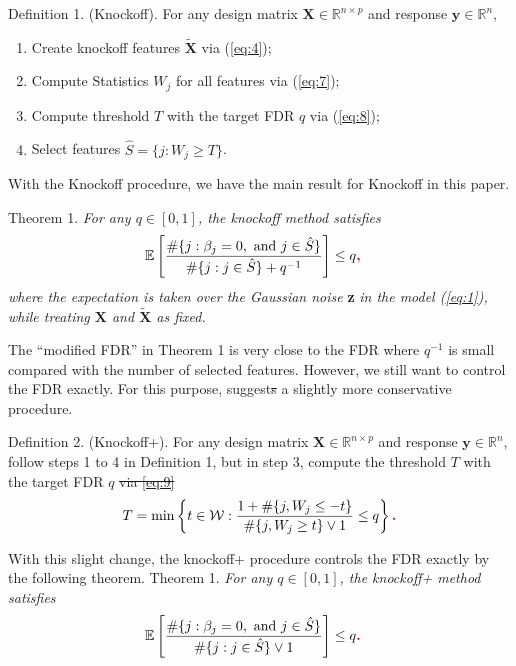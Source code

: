 \documentclass{uwstat572}
\newcommand{\vmdel}[1]{\sout{#1}}
\newcommand{\vmadd}[1]{\textbf{\color{red}{#1}}}
\begin{document}
{\sc Definition 1. }(Knockoff). For any design matrix $\bm{X}\in\mathbb{R}^{n\times p}$ and response $\bm{y}\in \mathbb{R}^n$, 
\begin{enumerate}
	\item Create knockoff features $\bm{\tilde X}$ via (\ref{eq:4});
	\item Compute Statistics $W_j$ for all features via (\ref{eq:7});
	\item Compute threshold $T$ with the target FDR $q$ via (\ref{eq:8});
	\item Select features $\hat{S} =\{j: W_j\geq T\}$.
\end{enumerate}

With the Knockoff procedure, we have the main result for Knockoff in this paper.

{\sc Theorem 1. } {\it For any $q\in[0,1]$, the knockoff method satisfies }
\begin{align*}
& \mathbb{E}\left[\frac{\#\{j:\beta_j=0,\text{ and }j\in \hat{S} \}}{\#\{j:j\in \hat{S} \} + q^{-1}} \right]\leq q\vmadd{,}
\end{align*}
{\it where the expectation is taken over the Gaussian noise }\textbf{z} {\it in the model (\ref{eq:1}), while treating $\bm{X}$ and $\bm{\tilde{X}}$ as fixed. }

The ``modified FDR'' in Theorem 1 is very close to the FDR where $q^{-1}$ is small compared with the number of selected features. However, we still want to control the FDR exactly. For this purpose, \cite{barber2015controlling} suggest\vmdel{s} a slightly more conservative procedure.

{\sc Definition 2. }(Knockoff+). For any design matrix $\bm{X}\in\mathbb{R}^{n\times p}$ and response $\bm{y}\in \mathbb{R}^n$, 
follow steps 1 to 4 in {\sc Definition 1}, but in step 3, compute the threshold $T$ with the target FDR $q$ \vmdel{via \ref{eq:9}} \vmadd{as follows:}
\begin{align}\label{eq:9}
T  = \min\left\{t\in\mathcal{W}: \frac{1+\#\{j, W_j\leq -t\}}{\#\{j, W_j\geq t\}\vee 1}\leq q \right\}\vmadd{.}
\end{align}

With this slight change, the knockoff+ procedure controls the FDR exactly by the following theorem.
{\sc Theorem 1. } {\it For any $q\in[0,1]$, the knockoff+ method satisfies }
\begin{align*}
& \mathbb{E}\left[\frac{\#\{j:\beta_j=0,\text{ and }j\in \hat{S} \}}{\#\{j:j\in \hat{S} \}\vee 1} \right]\leq q \vmadd{.}
\end{align*}
\end{document}
